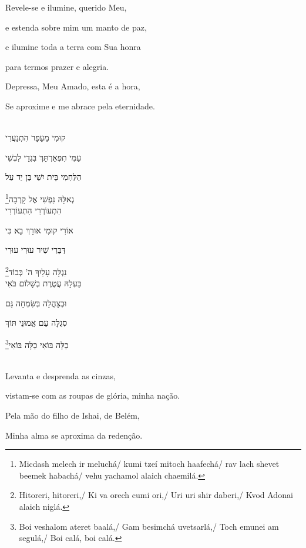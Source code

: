 Revele-se e ilumine, querido Meu,

e estenda sobre mim um manto de paz,

e ilumine toda a terra com Sua honra 

para termos prazer e alegria. 

Depressa, {Meu Amado}, esta é a hora,

Se aproxime e me abrace pela eternidade.




\movetoevenpage
\raggedleft

\vspace*{1cm}

\textsc{}\\[15pt]

קוּמִי מֵעָפָר הִתְנַעֲרִי

עַמִּי תִפְאַרְתֵּךְ בִּגְדֵי לִבְשִׁי 

הַלַּחְמִי בֵּית יִשַׁי בֶּן יַד עַל

\footnote{Micdash melech ir meluchá/ kumi tzeí mitoch haafechá/ 
		rav lach shevet beemek habachá/ vehu yachamol alaich chaemilá.}גְאלָּהּ נַפְשִׁי אֶל קָרְבָה\\[10pt]

הִתְעוֹרְרִי הִתְעוֹרְרִי

אוֹרִי קוּמִי אורֵךְ בָא כִּי

דַּבֵּרִי שִׁיר עוּרִי עוּרִי

\footnote{Hitoreri, hitoreri,/ Ki va orech cumi ori,/ Uri uri shir daberi,/
Kvod Adonai alaich niglá.}נִגְלָּה עָלַיִךְ ה' כְּבוֹד\\[10pt]

בַּעְלָהּ עֲטֶרֶת בְשָׁלוֹם בֹּאִי

וּבְצָהֳלָה בְּשִּׂמְחָה גַּם 

סְגֻלָּה עַם אֱמוּנֵי תּוֹךְ 

\footnote{
Boi veshalom ateret baalá,/ Gam besimchá uvetsarlá,/
Toch emunei am segulá,/ Boi calá, boi calá.}כַלָּה בּוֹאִי כַלָּה בּוֹאִי

\movetooddpage
\raggedright

\vspace*{1cm}

\textsc{}\\[15pt]


Levanta e desprenda as cinzas,

vistam-se com as roupas de glória, minha nação.

Pela mão do filho de Ishai, de Belém,

Minha alma se aproxima da redenção.\\[10pt]

